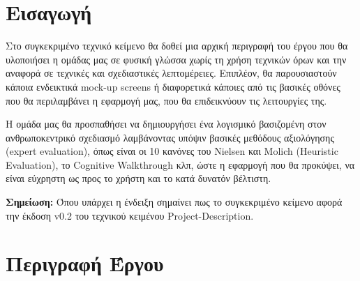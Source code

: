\documentclass{article}
\begin{document}
{
  \hypersetup{linkcolor=black}
  \tableofcontents
}

\section{Εισαγωγή}
    Στο συγκεκριμένο τεχνικό κείμενο θα δοθεί μια αρχική περιγραφή του έργου που θα υλοποιήσει η ομάδας μας σε φυσική γλώσσα χωρίς τη χρήση τεχνικών όρων και την αναφορά σε τεχνικές και σχεδιαστικές λεπτομέρειες. Επιπλέον, θα παρουσιαστούν κάποια ενδεικτικά mock-up screens ή διαφορετικά κάποιες από τις βασικές οθόνες που θα περιλαμβάνει η εφαρμογή μας, που θα επιδεικνύουν τις λειτουργίες της. \par
    Η ομάδα μας θα προσπαθήσει να δημιουργήσει ένα λογισμικό βασιζομένη στον ανθρωποκεντρικό σχεδιασμό λαμβάνοντας υπόψιν βασικές μεθόδους αξιολόγησης (expert evaluation), όπως είναι οι 10 κανόνες του Nielsen και Molich (Heuristic Evaluation), 
    το Cognitive Walkthrough κλπ, ώστε η εφαρμογή που θα προκύψει, να είναι εύχρηστη ως προς το χρήστη και το κατά δυνατόν βέλτιστη.
    
\vspace{0.3cm}

\textbf{Σημείωση:} Όπου υπάρχει η ένδειξη σημαίνει πως το συγκεκριμένο κείμενο αφορά την έκδοση v0.2 του τεχνικού κειμένου Project-Description.
    

\section{Περιγραφή Έργου}
\end{document}
